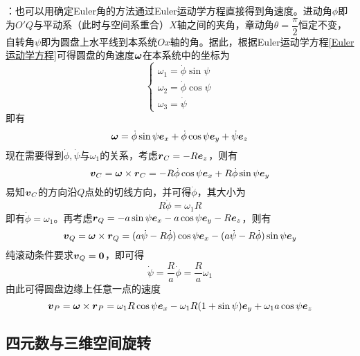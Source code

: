 \begin{solution}
：也可以用确定Euler角的方法通过Euler运动学方程直接得到角速度。进动角$\phi$即为$O'Q$与平动系（此时与空间系重合）$X$轴之间的夹角，章动角$\theta = \dfrac{\pi}{2}$恒定不变，自转角$\psi$即为圆盘上水平线到本系统$Ox$轴的角。据此，根据Euler运动学方程\eqref{Euler运动学方程}可得圆盘的角速度$\boldsymbol{\omega}$在本系统中的坐标为
\begin{equation*}
	\begin{cases}
		\omega_1 = \dot{\phi} \sin \psi \\
		\omega_2 = \dot{\phi} \cos \psi \\
		\omega_3 = \dot{\psi}
	\end{cases}
\end{equation*}
即有
\begin{equation*}
	\boldsymbol{\omega} = \dot{\phi} \sin \psi \boldsymbol{e}_x + \dot{\phi} \cos \psi \boldsymbol{e}_y + \dot{\psi} \boldsymbol{e}_z
\end{equation*}
现在需要得到$\dot{\phi},\dot{\psi}$与$\omega_1$的关系，考虑$\boldsymbol{r}_C = -R\boldsymbol{e}_z$，则有
\begin{equation*}
	\boldsymbol{v}_C = \boldsymbol{\omega} \times \boldsymbol{r}_C = -R\dot{\phi} \cos \psi \boldsymbol{e}_x + R\dot{\phi} \sin \psi \boldsymbol{e}_y
\end{equation*}
易知$\boldsymbol{v}_C$的方向沿$Q$点处的切线方向，并可得$\dot{\phi}$，其大小为
\begin{equation*}
	R\dot{\phi} = \omega_1 R
\end{equation*}
即有$\dot{\phi} = \omega_1$。再考虑$\boldsymbol{r}_Q = -a\sin \psi \boldsymbol{e}_x - a\cos \psi \boldsymbol{e}_y - R\boldsymbol{e}_z$，则有
\begin{equation*}
	\boldsymbol{v}_Q = \boldsymbol{\omega} \times \boldsymbol{r}_Q = (a\dot{\psi}-R\dot{\phi}) \cos \psi \boldsymbol{e}_x - (a\dot{\psi}-R\dot{\phi}) \sin \psi \boldsymbol{e}_y
\end{equation*}
纯滚动条件要求$\boldsymbol{v}_Q = \boldsymbol{0}$，即可得
\begin{equation*}
	\dot{\psi} = \frac{R}{a} \dot{\phi} = \frac{R}{a} \omega_1
\end{equation*}
由此可得圆盘边缘上任意一点的速度
\begin{equation*}
	\boldsymbol{v}_P = \boldsymbol{\omega} \times \boldsymbol{r}_P = \omega_1 R \cos \psi \boldsymbol{e}_x - \omega_1 R(1+\sin \psi) \boldsymbol{e}_y + \omega_1 a \cos \psi \boldsymbol{e}_z
\end{equation*}
\end{solution}

\subsection{四元数与三维空间旋转}

